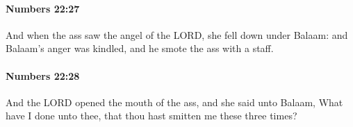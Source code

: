 		\paragraph{Numbers 22:27} %
			\label{NUMBERS-22-27}

			And when the ass saw the angel of the LORD, she fell down under Balaam: and Balaam’s anger was kindled, and he smote the ass with a staff.


		\paragraph{Numbers 22:28} %
			\label{NUMBERS-22-28}

			And the LORD opened the mouth of the ass, and she said unto Balaam, What have I done unto thee, that thou hast smitten me these three times?



